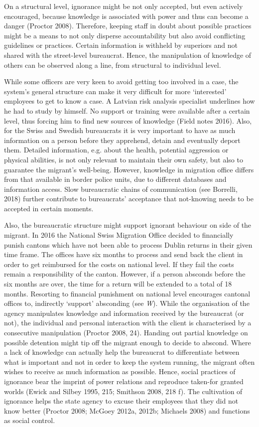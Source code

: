 \par
On a structural level, ignorance might be not only accepted, but even actively encouraged, because knowledge is associated with power and thus can become a danger (Proctor 2008). Therefore, keeping staff in doubt about possible practices might be a means to not only disperse accountability but also avoid conflicting guidelines or practices. Certain information is withheld by superiors and not shared with the street-level bureaucrat. Hence, the manipulation of knowledge of others can be observed along a line, from structural to individual level.
\par
While some officers are very keen to avoid getting too involved in a case, the system’s general structure can make it very difficult for more ‘interested’ employees to get to know a case. A Latvian risk analysis specialist underlines how he had to study by himself. No support or training were available after a certain level, thus forcing him to find new sources of knowledge (Field notes 2016). Also, for the Swiss and Swedish bureaucrats it is very important to have as much information on a person before they apprehend, detain and eventually deport them. Detailed information, e.g. about the health, potential aggression or physical abilities, is not only relevant to maintain their own safety, but also to guarantee the migrant’s well-being. However, knowledge in migration office differs from that available in border police units, due to different databases and information access. Slow bureaucratic chains of communication (see Borrelli, 2018) further contribute to bureaucrats' acceptance that not-knowing needs to be accepted in certain moments.
\par
Also, the bureaucratic structure might support ignorant behaviour on side of the migrant. In 2016 the National Swiss Migration Office decided to financially punish cantons which have not been able to process Dublin returns in their given time frame. The offices have six months to process and send back the client in order to get reimbursed for the costs on national level. If they fail the costs remain a responsibility of the canton. However, if a person absconds before the six months are over, the time for a return will be extended to a total of 18 months. Resorting to financial punishment on national level encourages cantonal offices to, indirectly ‘support’ absconding (see \emph{W}). While the organisation of the agency manipulates knowledge and information received by the bureaucrat (or not), the individual and personal interaction with the client is characterised by a consecutive manipulation (Proctor 2008, 24). Handing out partial knowledge on possible detention might tip off the migrant enough to decide to abscond. Where a lack of knowledge can actually help the bureaucrat to differentiate between what is important and not in order to keep the system running, the migrant often wishes to receive as much information as possible. Hence, social practices of ignorance bear the imprint of power relations and reproduce taken-for granted worlds (Ewick and Silbey 1995, 215; Smithson 2008, 218 f). The cultivation of ignorance helps the state agency to excuse their employees that they did not know better (Proctor 2008; McGoey 2012a, 2012b; Michaels 2008) and functions as social control.
